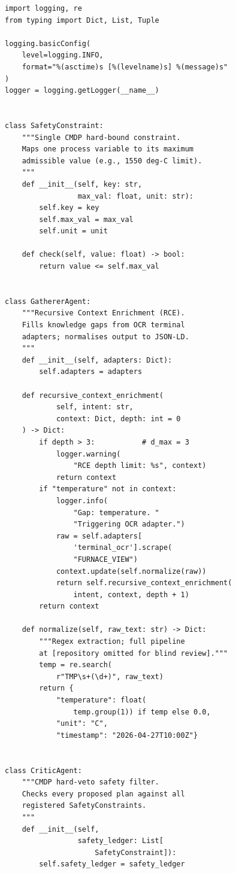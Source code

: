 \documentclass[conference]{IEEEtran}
\newcommand{\MALA}{Multi Agent Legacy Architecture (MALA)}
\begin{document}
\begin{lstlisting}[caption={\MALA{} core: RCE Gatherer, CMDP Critic, and HotL escalation.}, label={lst:mala}]
import logging, re
from typing import Dict, List, Tuple

logging.basicConfig(
    level=logging.INFO,
    format="%(asctime)s [%(levelname)s] %(message)s"
)
logger = logging.getLogger(__name__)


class SafetyConstraint:
    """Single CMDP hard-bound constraint.
    Maps one process variable to its maximum
    admissible value (e.g., 1550 deg-C limit).
    """
    def __init__(self, key: str,
                 max_val: float, unit: str):
        self.key = key
        self.max_val = max_val
        self.unit = unit

    def check(self, value: float) -> bool:
        return value <= self.max_val


class GathererAgent:
    """Recursive Context Enrichment (RCE).
    Fills knowledge gaps from OCR terminal
    adapters; normalises output to JSON-LD.
    """
    def __init__(self, adapters: Dict):
        self.adapters = adapters

    def recursive_context_enrichment(
            self, intent: str,
            context: Dict, depth: int = 0
    ) -> Dict:
        if depth > 3:           # d_max = 3
            logger.warning(
                "RCE depth limit: %s", context)
            return context
        if "temperature" not in context:
            logger.info(
                "Gap: temperature. "
                "Triggering OCR adapter.")
            raw = self.adapters[
                'terminal_ocr'].scrape(
                "FURNACE_VIEW")
            context.update(self.normalize(raw))
            return self.recursive_context_enrichment(
                intent, context, depth + 1)
        return context

    def normalize(self, raw_text: str) -> Dict:
        """Regex extraction; full pipeline
        at [repository omitted for blind review]."""
        temp = re.search(
            r"TMP\s+(\d+)", raw_text)
        return {
            "temperature": float(
                temp.group(1)) if temp else 0.0,
            "unit": "C",
            "timestamp": "2026-04-27T10:00Z"}


class CriticAgent:
    """CMDP hard-veto safety filter.
    Checks every proposed plan against all
    registered SafetyConstraints.
    """
    def __init__(self,
                 safety_ledger: List[
                     SafetyConstraint]):
        self.safety_ledger = safety_ledger


\end{lstlisting}
\end{document}
